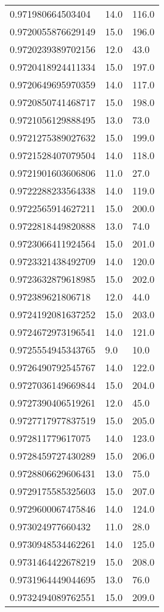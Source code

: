 \begin{center}
\begin{supertabular}[H]{p{0.30\textwidth}p{0.05\textwidth}p{0.05\textwidth}}
0.971980664503404 & 14.0 & 116.0 \\ 
0.9720055876629149 & 15.0 & 196.0 \\ 
0.9720239389702156 & 12.0 & 43.0 \\ 
0.9720418924411334 & 15.0 & 197.0 \\ 
0.9720649695970359 & 14.0 & 117.0 \\ 
0.9720850741468717 & 15.0 & 198.0 \\ 
0.9721056129888495 & 13.0 & 73.0 \\ 
0.9721275389027632 & 15.0 & 199.0 \\ 
0.9721528407079504 & 14.0 & 118.0 \\ 
0.9721901603606806 & 11.0 & 27.0 \\ 
0.9722288233564338 & 14.0 & 119.0 \\ 
0.9722565914627211 & 15.0 & 200.0 \\ 
0.9722818449820888 & 13.0 & 74.0 \\ 
0.9723066411924564 & 15.0 & 201.0 \\ 
0.9723321438492709 & 14.0 & 120.0 \\ 
0.9723632879618985 & 15.0 & 202.0 \\ 
0.972389621806718 & 12.0 & 44.0 \\ 
0.9724192081637252 & 15.0 & 203.0 \\ 
0.9724672973196541 & 14.0 & 121.0 \\ 
0.9725554945343765 & 9.0 & 10.0 \\ 
0.9726490792545767 & 14.0 & 122.0 \\ 
0.9727036149669844 & 15.0 & 204.0 \\ 
0.9727390406519261 & 12.0 & 45.0 \\ 
0.9727717977837519 & 15.0 & 205.0 \\ 
0.972811779617075 & 14.0 & 123.0 \\ 
0.9728459727430289 & 15.0 & 206.0 \\ 
0.9728806629606431 & 13.0 & 75.0 \\ 
0.9729175585325603 & 15.0 & 207.0 \\ 
0.9729600067475846 & 14.0 & 124.0 \\ 
0.973024977660432 & 11.0 & 28.0 \\ 
0.9730948534462261 & 14.0 & 125.0 \\ 
0.9731464422678219 & 15.0 & 208.0 \\ 
0.9731964449044695 & 13.0 & 76.0 \\ 
0.9732494089762551 & 15.0 & 209.0 \\ 

\end{supertabular}
\end{center}
